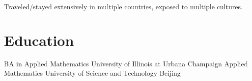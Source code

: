 \documentclass[]{friggeri-cv}
\begin{document}
Traveled/stayed extensively in multiple countries, exposed to multiple cultures.


\section{Education}

\begin{entrylist}
  {BA in Applied Mathematics}
  {University of Illinois at Urbana Champaign}
  {}
  {Applied Mathematics}
  {University of Science and Technology Beijing}
  {}
\end{entrylist}
\end{document}
